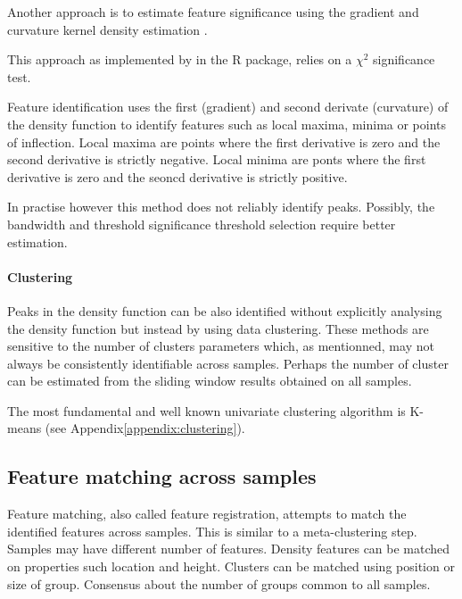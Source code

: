 Another approach is to estimate feature significance using the gradient and curvature kernel density estimation \citep{Chaudhuri:1999gu,Duong:2008eu}.

This approach as implemented by  in the  R package, relies on a $\chi^2$ significance test.

Feature identification uses the first (gradient) and second derivate (curvature) of the density function to identify features such as local maxima, minima or points of inflection.
Local maxima are points where the first derivative is zero and the second derivative is strictly negative.
Local minima are ponts where the first derivative is zero and the seoncd derivative is strictly positive.

In practise however this method does not reliably identify peaks.
Possibly, the bandwidth and threshold significance threshold selection require better estimation.


\paragraph{Clustering}
Peaks in the density function can be also identified without explicitly analysing the density function but instead by using data clustering.
These methods are sensitive to the number of clusters parameters which, as mentionned, may not always be consistently identifiable across samples.
Perhaps the number of cluster can be estimated from the sliding window results obtained on all samples.

The most fundamental and well known univariate clustering algorithm is K-means (see Appendix\ref{appendix:clustering}).


\subsection{Feature matching across samples }

Feature matching, also called feature registration, attempts to match the identified features across samples.
This is similar to a meta-clustering step.
Samples may have different number of features.
Density features can be matched on properties such location and height.
Clusters can be matched using position or size of group.
Consensus about the number of groups common to all samples.


